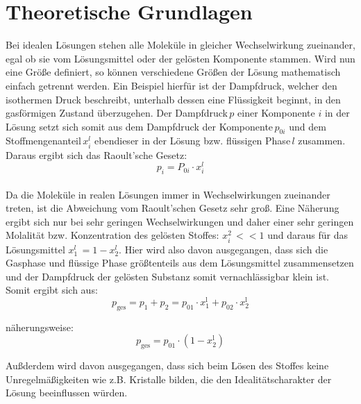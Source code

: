 \documentclass[12pt,a4paper,titlepage,headinclude,bibtotoc]{scrartcl}
\begin{document}
\tableofcontents

\newpage

\section{Theoretische Grundlagen}

Bei idealen Lösungen stehen alle Moleküle in gleicher Wechselwirkung zueinander, egal ob sie vom Lösungsmittel oder der gelösten Komponente stammen. 
Wird nun eine Größe definiert, so können verschiedene Größen der Lösung mathematisch einfach getrennt werden. Ein Beispiel hierfür ist der Dampfdruck, welcher den isothermen Druck beschreibt, unterhalb dessen eine Flüssigkeit beginnt, in den gasförmigen Zustand überzugehen.
Der Dampfdruck\,$p$ einer Komponente $i$ in der Lösung setzt sich somit aus dem Dampfdruck der Komponente\,$p_{0i}$ und dem Stoffmengenanteil\,$x_i^l$ ebendieser in der Lösung bzw. flüssigen Phase\,$l$ zusammen.
Daraus ergibt sich das Raoult'sche Gesetz:\\

\begin{equation}
p_i = P_{0i} \cdot x_i^{l}
\end{equation}
\\

Da die Moleküle in realen Lösungen immer in Wechselwirkungen zueinander treten, ist die Abweichung vom Raoult'schen Gesetz sehr groß. Eine Näherung ergibt sich nur bei sehr geringen Wechselwirkungen und daher einer sehr geringen Molalität bzw. Konzentration des gelösten Stoffes: $x_i^2\,<<1$ und daraus für das Lösungsmittel $x_1^l\,= 1 - x_2^l$. Hier wird also davon ausgegangen, dass sich die Gasphase und flüssige Phase größtenteils aus dem Lösungsmittel zusammensetzen und der Dampfdruck der gelösten Substanz somit vernachlässigbar klein ist. Somit ergibt sich aus: \\

\begin{equation}
p_\mathrm{ges} = p_1 + p_2 = p_{01} \cdot x_1^\mathrm{l} + p_{02} \cdot x_2^\mathrm{l}
\end{equation}

näherungsweise:
\begin{equation}
p_\mathrm{ges} = p_{01} \cdot (1-x_2^\mathrm{l})
\end{equation}

Außderdem wird davon ausgegangen, dass sich beim Lösen des Stoffes keine Unregelmäßigkeiten wie z.B. Kristalle bilden, die den Idealitätscharakter der Lösung beeinflussen würden.\\
\end{document}
